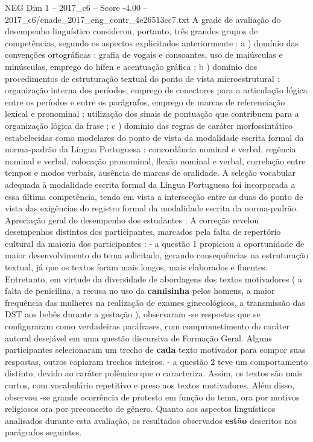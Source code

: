\begin{textsample}{NEG Dim 1 – 2017\_c6 – Score -4.00 – 2017\_c6/enade\_2017\_eng\_contr\_4e26513cc7.txt}
A grade de avaliação do desempenho linguístico considerou, portanto, três grandes grupos de competências, segundo os aspectos explicitados anteriormente : a ) domínio das convenções ortográficas : grafia de vogais e consoantes, uso de maiúsculas e minúsculas, emprego do hífen e acentuação gráfica ; b ) domínio dos procedimentos de estruturação textual do ponto de vista microestrutural : organização interna dos períodos, emprego de conectores para a articulação lógica entre os períodos e entre os parágrafos, emprego de marcas de referenciação lexical e pronominal ; utilização dos sinais de pontuação que contribuem para a organização lógica da frase ; c ) domínio das regras de caráter morfossintático estabelecidas como modelares do ponto de vista da modalidade escrita formal da norma-padrão da Língua Portuguesa : concordância nominal e verbal, regência nominal e verbal, colocação pronominal, flexão nominal e verbal, correlação entre tempos e modos verbais, ausência de marcas de oralidade.
A seleção vocabular adequada à modalidade escrita formal da Língua Portuguesa foi incorporada a essa última competência, tendo em vista a intersecção entre as duas do ponto de vista das exigências do registro formal da modalidade escrita da norma-padrão.
Apreciação geral do desempenho dos estudantes : A correção revelou desempenhos distintos dos participantes, marcados pela falta de repertório cultural da maioria dos participantes : - a questão 1 propiciou a oportunidade de maior desenvolvimento do tema solicitado, gerando consequências na estruturação textual, já que os textos foram mais longos, mais elaborados e fluentes.
Entretanto, em virtude da diversidade de abordagens dos textos motivadores ( a falta de penicilina, a recusa no uso da \textbf{camisinha} pelos homens, a maior frequência das mulheres na realização de exames ginecológicos, a transmissão das DST aos bebês durante a gestação ), observaram -se respostas que se configuraram como verdadeiras paráfrases, com comprometimento do caráter autoral desejável em uma questão discursiva de Formação Geral.
Alguns participantes selecionaram um trecho de \textbf{cada} texto motivador para compor suas respostas, outros copiaram trechos inteiros. - a questão 2 teve um comportamento distinto, devido ao caráter polêmico que o caracteriza.
Assim, os textos são mais curtos, com vocabulário repetitivo e preso aos textos motivadores.
Além disso, observou -se grande ocorrência de protesto em função do tema, ora por motivos religiosos ora por preconceito de gênero.
Quanto aos aspectos linguísticos analisados durante esta avaliação, os resultados observados \textbf{estão} descritos nos parágrafos seguintes.

\end{textsample}
